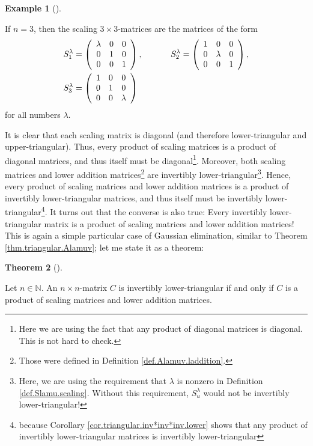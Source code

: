 \documentclass[numbers=enddot,12pt,final,onecolumn,notitlepage]{scrartcl}%
\theoremstyle{definition}
\newtheorem{theo}{Theorem}[section]
\newenvironment{theorem}[1][]
{\begin{theo}[#1]\begin{leftbar}}
{\end{leftbar}\end{theo}}
\newtheorem{exam}[theo]{Example}
\newenvironment{example}[1][]
{\begin{exam}[#1]\begin{leftbar}}
{\end{leftbar}\end{exam}}
\begin{document}
\begin{example}
If $n=3$, then the scaling $3\times3$-matrices are the matrices of the form%
\begin{align*}
S_{1}^{\lambda}  &  =\left(
\begin{array}
[c]{ccc}%
\lambda & 0 & 0\\
0 & 1 & 0\\
0 & 0 & 1
\end{array}
\right)  ,\ \ \ \ \ \ \ \ \ \ S_{2}^{\lambda}=\left(
\begin{array}
[c]{ccc}%
1 & 0 & 0\\
0 & \lambda & 0\\
0 & 0 & 1
\end{array}
\right)  ,\\
S_{3}^{\lambda}  &  =\left(
\begin{array}
[c]{ccc}%
1 & 0 & 0\\
0 & 1 & 0\\
0 & 0 & \lambda
\end{array}
\right)
\end{align*}
for all numbers $\lambda$.
\end{example}

It is clear that each scaling matrix is diagonal (and therefore
lower-triangular and upper-triangular). Thus, every product of scaling
matrices is a product of diagonal matrices, and thus itself must be
diagonal\footnote{Here we are using the fact that any product of diagonal
matrices is diagonal. This is not hard to check.}. Moreover, both scaling
matrices and lower addition matrices\footnote{Those were defined in Definition
\ref{def.Alamuv.laddition}.} are invertibly lower-triangular\footnote{Here, we
are using the requirement that $\lambda$ is nonzero in Definition
\ref{def.Slamu.scaling}. Without this requirement, $S_{u}^{\lambda}$ would not
be invertibly lower-triangular!}. Hence, every product of scaling matrices and
lower addition matrices is a product of invertibly lower-triangular matrices,
and thus itself must be invertibly lower-triangular\footnote{because Corollary
\ref{cor.triangular.inv*inv*inv.lower} shows that any product of invertibly
lower-triangular matrices is invertibly lower-triangular}. It turns out that
the converse is also true: Every invertibly lower-triangular matrix is a
product of scaling matrices and lower addition matrices! This is again a
simple particular case of Gaussian elimination, similar to Theorem
\ref{thm.triangular.Alamuv}; let me state it as a theorem:

\begin{theorem}
\label{thm.triangular.Slamu}Let $n\in\mathbb{N}$. An $n\times n$-matrix $C$ is
invertibly lower-triangular if and only if $C$ is a product of scaling
matrices and lower addition matrices.
\end{theorem}
\end{document}
